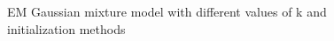 \documentclass[a4paper, 11pt]{article}
\begin{document}
\begin{figure}
{}
\caption[]{EM Gaussian mixture model with different values of k and initialization methods}
\label{fig:kmeans3}
\end{figure}

\pagebreak

\end{document}
